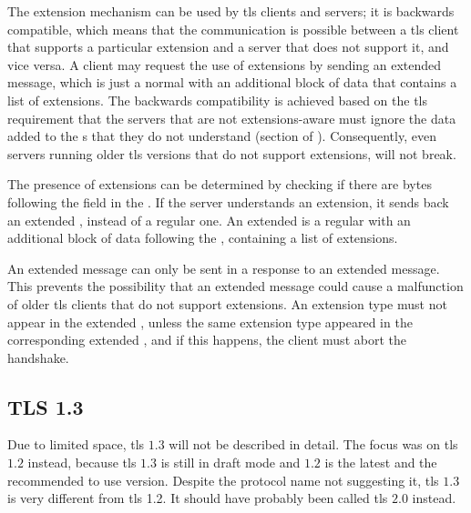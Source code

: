 \documentclass{llncs}
\begin{document}
The extension mechanism can be used by \gls{tls} clients and servers; it is backwards
compatible, which means that the communication is possible between a \gls{tls} client that supports a particular extension and a server that does not support it,
and vice versa. A client may request the use of extensions by sending an extended 
message, which is just a normal  with an additional
block of data that contains a list of extensions. The backwards compatibility is achieved based on the \gls{tls}
requirement that the servers that are not extensions-aware must ignore the data
added to the s that they do not understand (section  of \cite{RFC2246}). Consequently,
even servers running older \gls{tls} versions that do not support extensions, will not break.

The presence of extensions can be determined by checking if there are bytes
following the  field in the .
If the server understands an extension, it sends back an extended ,
instead of a regular one. An extended  is a regular
 with an additional block of data following the
, containing a list of extensions.

An extended  message can only be sent in a response to an
extended  message. This prevents the possibility that an extended
 message could cause a malfunction of older \gls{tls} clients that do not
support extensions. An extension type must not appear in the
extended , unless the same extension type appeared in the
corresponding extended , and if this happens, the client must abort the handshake.

\subsection{TLS 1.3} \label{tls-13}

Due to limited space, \gls{tls} $1.3$\cite{I-D.ietf-tls-tls13} will not be described in detail. The focus was on \gls{tls} $1.2$ instead, because \gls{tls} $1.3$ is still in draft
mode and $1.2$ is the latest and the recommended to use version.
Despite the protocol name not suggesting it, \gls{tls} $1.3$ is
very different from \gls{tls} 1.2. It should have probably been called
\gls{tls} $2.0$ instead.
\end{document}
